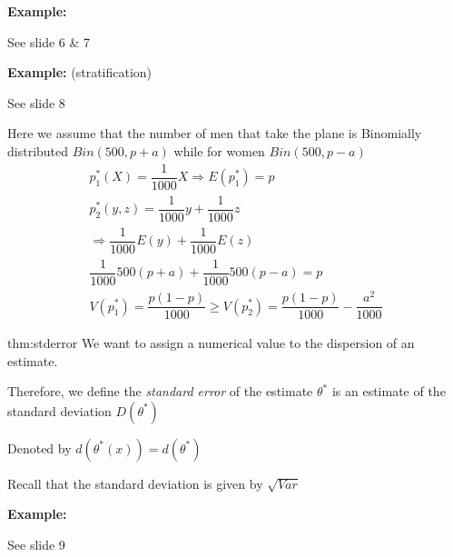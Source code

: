 \par\bigskip
\noindent\textbf{Example:}\par
\noindent See slide 6 \& 7
\par\bigskip
\noindent\textbf{Example:} (stratification)\par
\noindent See slide 8
\par\bigskip
\noindent Here we assume that the number of men that take the plane is Binomially distributed $Bin(500,p+a)$ while for women $Bin(500,p-a)$ 
\begin{equation*}
  \begin{gathered}
    p_1^*(X)  = \dfrac{1}{1000}X\Rightarrow E(p_1^*) = p\\
    p_2^*(y,z) = \dfrac{1}{1000}y+\dfrac{1}{1000}z\\
    \Rightarrow \dfrac{1}{1000}E(y)+\dfrac{1}{1000}E(z)\\
    \dfrac{1}{1000}500(p+a)+\dfrac{1}{1000}500(p-a) = p\\
    V(p_1^*) = \dfrac{p(1-p)}{1000}\geq V(p_2^*) = \dfrac{p(1-p)}{1000}-\dfrac{a^2}{1000}
  \end{gathered}
\end{equation*}
\newpage
\begin{theo}{thm:stderror}
  We want to assign a numerical value to the dispersion of an estimate.\par
  \noindent Therefore, we define the \textit{standard error} of the estimate $\theta^*$ is an estimate of the standard deviation $D(\theta^*)$
  \par\bigskip
  \noindent Denoted by $d(\theta^*(x)) = d(\theta^*)$
  \par\bigskip
  \noindent Recall that the standard deviation is given by $\sqrt{Var}$
\end{theo}
\par\bigskip
\noindent\textbf{Example:}\par
\noindent See slide 9
\par\bigskip
